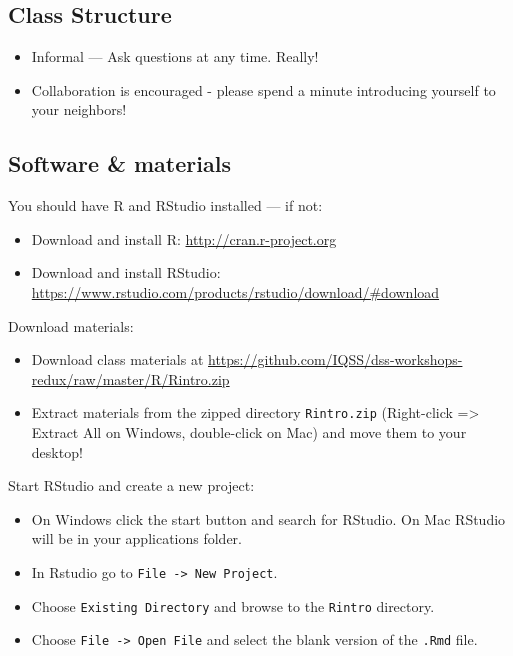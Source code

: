 \documentclass[]{book}
\providecommand{\tightlist}{%
  \setlength{\itemsep}{0pt}\setlength{\parskip}{0pt}}
\begin{document}
\subsection{Class Structure}\label{class-structure}

\begin{itemize}
\tightlist
\item
  Informal --- Ask questions at any time. Really!
\item
  Collaboration is encouraged - please spend a minute introducing
  yourself to your neighbors!
\end{itemize}

\subsection{Software \& materials}\label{software-materials}

You should have R and RStudio installed --- if not:

\begin{itemize}
\tightlist
\item
  Download and install R: \url{http://cran.r-project.org}
\item
  Download and install RStudio:
  \url{https://www.rstudio.com/products/rstudio/download/\#download}
\end{itemize}

Download materials:

\begin{itemize}
\tightlist
\item
  Download class materials at
  \url{https://github.com/IQSS/dss-workshops-redux/raw/master/R/Rintro.zip}
\item
  Extract materials from the zipped directory \texttt{Rintro.zip}
  (Right-click =\textgreater{} Extract All on Windows, double-click on
  Mac) and move them to your desktop!
\end{itemize}

Start RStudio and create a new project:

\begin{itemize}
\tightlist
\item
  On Windows click the start button and search for RStudio. On Mac
  RStudio will be in your applications folder.
\item
  In Rstudio go to \texttt{File\ -\textgreater{}\ New\ Project}.
\item
  Choose \texttt{Existing\ Directory} and browse to the \texttt{Rintro}
  directory.
\item
  Choose \texttt{File\ -\textgreater{}\ Open\ File} and select the blank
  version of the \texttt{.Rmd} file.
\end{itemize}
\end{document}
